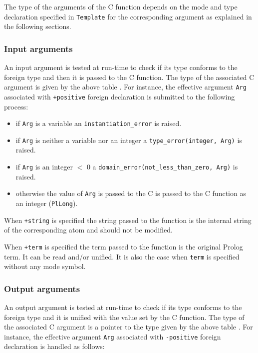 The type of the arguments of the C function depends on the mode and type
declaration specified in \texttt{Template} for the corresponding argument as
explained in the following sections.

\subsubsection{Input arguments}
\label{Input-arguments}
An input argument is tested at run-time to check if its type conforms to the
foreign type and then it is passed to the C function. The type of the
associated C argument is given by the above table . For instance, the effective argument \texttt{Arg} associated with
\texttt{+positive} foreign declaration is submitted to the following
process:

\begin{itemize}

\item if \texttt{Arg} is a variable an \texttt{instantiation\_error} is
raised.

\item if \texttt{Arg} is neither a variable nor an integer a
\texttt{type\_error(integer, Arg)} is raised.

\item if \texttt{Arg} is an integer $<$ 0 a
\texttt{domain\_error(not\_less\_than\_zero, Arg)} is raised.

\item otherwise the value of \texttt{Arg} is passed to the C is passed to
the C function as an integer (\texttt{PlLong}).

\end{itemize}

When \texttt{+string} is specified the string passed to the function is the
internal string of the corresponding atom and should not be modified.

When \texttt{+term} is specified the term passed to the function is the
original Prolog term. It can be read and/or unified. It is also the case
when \texttt{term} is specified without any mode symbol.

\subsubsection{Output arguments}
\label{Output-arguments}
An output argument is tested at run-time to check if its type conforms to
the foreign type and it is unified with the value set by the C function. The
type of the associated C argument is a pointer to the type given by the
above table . For instance, the effective
argument \texttt{Arg} associated with \texttt{-positive} foreign declaration
is handled as follows:

